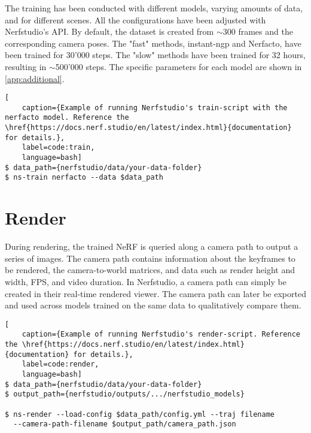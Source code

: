 The training has been conducted with different models, varying amounts of data, and for different scenes. All the configurations have been adjusted with Nerfstudio's API. By default, the dataset is created from $\sim$300 frames and the corresponding camera poses. The "fast" methods, instant-ngp and Nerfacto, have been trained for 30'000 steps. The "slow" methods have been trained for 32 hours, resulting in $\sim$500'000 steps. The specific parameters for each model are shown in \autoref{app:additional}.

\begin{lstlisting}[
    caption={Example of running Nerfstudio's train-script with the nerfacto model. Reference the \href{https://docs.nerf.studio/en/latest/index.html}{documentation} for details.},
    label=code:train,
    language=bash]
$ data_path={nerfstudio/data/your-data-folder}
$ ns-train nerfacto --data $data_path
\end{lstlisting}

\section{Render}
During rendering, the trained NeRF is queried along a camera path to output a series of images. The camera path contains information about the keyframes to be rendered, the camera-to-world matrices, and data such as render height and width, FPS, and video duration. In Nerfstudio, a camera path can simply be created in their real-time rendered viewer. The camera path can later be exported and used across models trained on the same data to qualitatively compare them.


\begin{lstlisting}[
    caption={Example of running Nerfstudio's render-script. Reference the \href{https://docs.nerf.studio/en/latest/index.html}{documentation} for details.},
    label=code:render,
    language=bash]
$ data_path={nerfstudio/data/your-data-folder}
$ output_path={nerfstudio/outputs/.../nerfstudio_models}

$ ns-render --load-config $data_path/config.yml --traj filename 
  --camera-path-filename $output_path/camera_path.json
\end{lstlisting}




